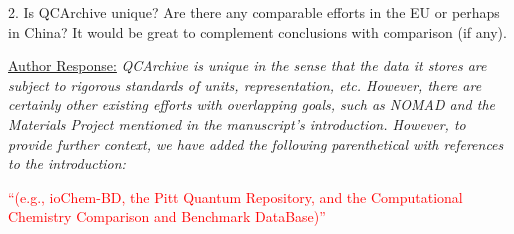 \documentclass[12pt]{article}
\begin{document}
2.	Is QCArchive unique? Are there any comparable efforts in the EU or perhaps in China? It would be great to complement conclusions with comparison (if any).

\noindent
\underline{Author Response:} \textit{ QCArchive is unique in the sense that the
data it stores are subject to rigorous standards of units, representation, etc.
However, there are certainly other existing efforts with overlapping goals, such
as NOMAD and the Materials Project mentioned in the manuscript's introduction.
However, to provide further context, we have added the following parenthetical
with references
to the introduction:}

\noindent
\textcolor{red}{``(e.g., ioChem-BD, the Pitt Quantum Repository, and the
Computational Chemistry Comparison and Benchmark DataBase)''}
\end{document}
